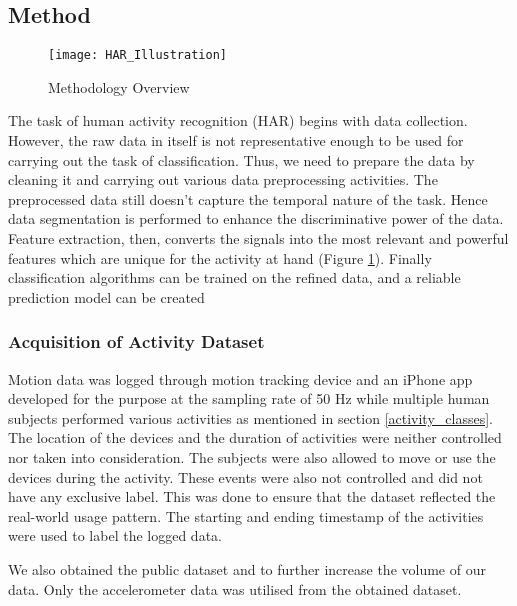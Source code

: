 \documentclass[
10pt,           %
a4paper,        %
oneside,        %
headinclude,footinclude, %
]{scrartcl}
\begin{document}
\subsection{Method}

\begin{figure}[p]
  \begin{center}
    \texttt{[image: HAR\_Illustration]}
  \end{center}
  \vspace{-10pt}
  \caption{\label{har_illustration}Methodology Overview}
\end{figure}

The task of human activity recognition (HAR) begins with data collection. However, the raw data in itself is not representative enough to be used for carrying out the task of classification. Thus, we need to prepare the data by cleaning it and carrying out various data preprocessing activities. The preprocessed data still doesn’t capture the temporal nature of the task. Hence data segmentation is performed to enhance the discriminative power of the data. Feature extraction, then, converts the signals into the most relevant and powerful features which are unique for the activity at hand (Figure \ref{har_illustration}). Finally classification algorithms can be trained on the refined data, and a reliable prediction model can be created

\subsubsection{Acquisition of Activity Dataset}
Motion data was logged through motion tracking device and an iPhone app developed for the purpose at the sampling rate of 50 Hz while multiple human subjects performed various activities as mentioned in section \ref{activity_classes}. The location of the devices and the duration of activities were neither controlled nor taken into consideration. The subjects were also allowed to move or use the devices during the activity. These events were also not controlled and did not have any exclusive label. This was done to ensure that the dataset reflected the real-world usage pattern. The starting and ending timestamp of the activities were used to label the logged data.

We also obtained the public dataset \cite{Reyes-Ortiz2015} and \cite{Shoaib2014} to further increase the volume of our data. Only the accelerometer data was utilised from the obtained dataset.
\end{document}
